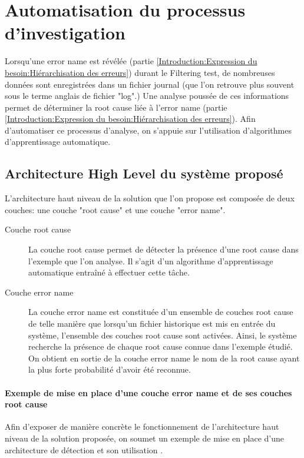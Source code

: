 \chapter{Automatisation du processus d'investigation}
\label{Automatisation du processus d'investigation}
\thispagestyle{fancy}
Lorsqu'une error name est révélée (partie \ref{Introduction:Expression du besoin:Hiérarchisation des erreurs}) durant le Filtering test, de nombreuses données sont enregistrées dans un fichier journal (que l'on retrouve plus souvent sous le terme anglais de fichier "log".) Une analyse poussée de ces informations permet de déterminer la root cause liée à l'error name (partie \ref{Introduction:Expression du besoin:Hiérarchisation des erreurs}). Afin d'automatiser ce processus d'analyse, on s'appuie sur l'utilisation d'algorithmes d'apprentissage automatique. 

\section{Architecture High Level du système proposé}
\label{Automatisation du processus d'investigation: Achitecture High Level du système proposé}
L'architecture haut niveau de la solution que l'on propose est composée de deux couches: une couche "root cause" et une couche "error name".
\begin{description}
	\item [Couche root cause] La couche root cause permet de détecter la présence d'une root cause dans l'exemple que l'on analyse. Il s'agit d'un algorithme d'apprentissage automatique entraîné à effectuer cette tâche.
	\item [Couche error name] La couche error name est constituée d'un ensemble de couches root cause de telle manière que lorsqu'un fichier historique est mis en entrée du système, l'ensemble des couches root cause sont activées. Ainsi, le système recherche la présence de chaque root cause connue dans l'exemple étudié. On obtient en sortie de la couche error name le nom de la root cause ayant la plus forte probabilité d'avoir été reconnue.
\end{description} 

\subsubsection{Exemple de mise en place  d'une couche error name et de ses couches root cause}
Afin d'exposer de manière concrète le fonctionnement de l'architecture haut niveau de la solution proposée, on soumet un exemple de mise en place d'une architecture de détection et son utilisation . \\

